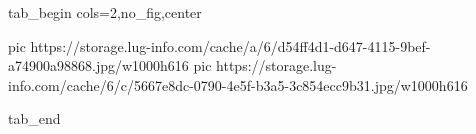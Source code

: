  
 
 
 
 


\ifcmt
  tab_begin cols=2,no_fig,center

     pic https://storage.lug-info.com/cache/a/6/d54ff4d1-d647-4115-9bef-a74900a98868.jpg/w1000h616%
		 pic https://storage.lug-info.com/cache/6/c/5667e8dc-0790-4e5f-b3a5-3c854ecc9b31.jpg/w1000h616%

  tab_end
\fi
